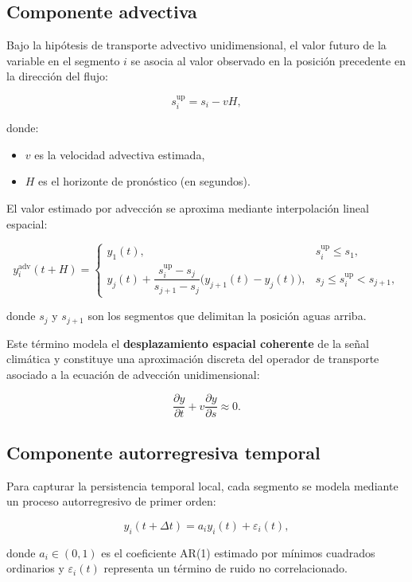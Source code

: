 \documentclass[
  spanish,
  us-letterpaper,
]{scrreprt}
\providecommand{\tightlist}{%
  \setlength{\itemsep}{0pt}\setlength{\parskip}{0pt}}
\numberwithin{equation}{section}
\begin{document}
\subsection{Componente advectiva}\label{componente-advectiva}

Bajo la hipótesis de transporte advectivo unidimensional, el valor
futuro de la variable en el segmento \(i\) se asocia al valor observado
en la posición precedente en la dirección del flujo:

\[
s_i^{\text{up}} = s_i - vH,
\]

donde:

\begin{itemize}
\tightlist
\item
  \(v\) es la velocidad advectiva estimada,
\item
  \(H\) es el horizonte de pronóstico (en segundos).
\end{itemize}

El valor estimado por advección se aproxima mediante interpolación
lineal espacial:

\[
y_i^{\text{adv}}(t+H) =
\begin{cases}
y_1(t), & s_i^{\text{up}} \le s_1, \\[6pt]
y_j(t) + \dfrac{s_i^{\text{up}} - s_j}{s_{j+1}-s_j}\bigl(y_{j+1}(t)-y_j(t)\bigr), & s_j \le s_i^{\text{up}} < s_{j+1},
\end{cases}
\]

donde \(s_j\) y \(s_{j+1}\) son los segmentos que delimitan la posición
aguas arriba.

Este término modela el \textbf{desplazamiento espacial coherente} de la
señal climática y constituye una aproximación discreta del operador de
transporte asociado a la ecuación de advección unidimensional:

\[
\frac{\partial y}{\partial t} + v \frac{\partial y}{\partial s} \approx 0.
\]

\subsection{Componente autorregresiva
temporal}\label{componente-autorregresiva-temporal}

Para capturar la persistencia temporal local, cada segmento se modela
mediante un proceso autorregresivo de primer orden:

\[
y_i(t+\Delta t) = a_i y_i(t) + \varepsilon_i(t),
\]

donde \(a_i \in (0,1)\) es el coeficiente AR(1) estimado por mínimos
cuadrados ordinarios y \(\varepsilon_i(t)\) representa un término de
ruido no correlacionado.
\end{document}
